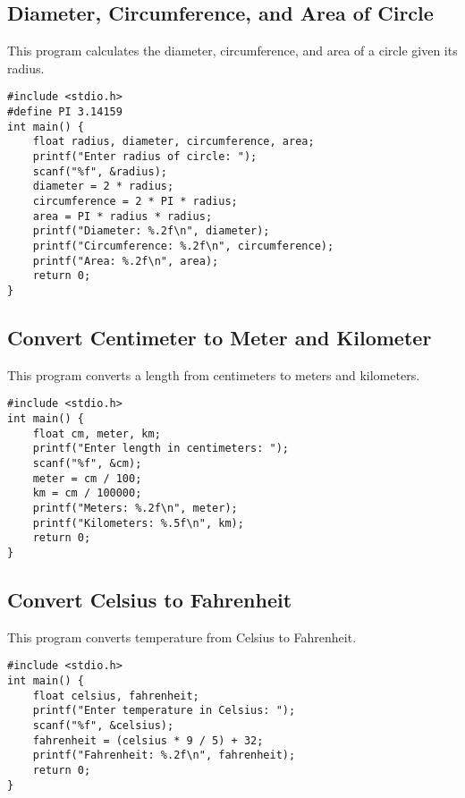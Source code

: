 \documentclass[a4paper,12pt]{article}
\begin{document}
\newpage

\subsection{Diameter, Circumference, and Area of Circle}
This program calculates the diameter, circumference, and area of a circle given its radius.

\begin{lstlisting}[caption={Diameter, Circumference, and Area of Circle}]
#include <stdio.h>
#define PI 3.14159
int main() {
    float radius, diameter, circumference, area;
    printf("Enter radius of circle: ");
    scanf("%f", &radius);
    diameter = 2 * radius;
    circumference = 2 * PI * radius;
    area = PI * radius * radius;
    printf("Diameter: %.2f\n", diameter);
    printf("Circumference: %.2f\n", circumference);
    printf("Area: %.2f\n", area);
    return 0;
}
\end{lstlisting}

\newpage

\subsection{Convert Centimeter to Meter and Kilometer}
This program converts a length from centimeters to meters and kilometers.

\begin{lstlisting}[caption={Convert Centimeter to Meter and Kilometer}]
#include <stdio.h>
int main() {
    float cm, meter, km;
    printf("Enter length in centimeters: ");
    scanf("%f", &cm);
    meter = cm / 100;
    km = cm / 100000;
    printf("Meters: %.2f\n", meter);
    printf("Kilometers: %.5f\n", km);
    return 0;
}
\end{lstlisting}

\newpage

\subsection{Convert Celsius to Fahrenheit}
This program converts temperature from Celsius to Fahrenheit.

\begin{lstlisting}[caption={Convert Celsius to Fahrenheit}]
#include <stdio.h>
int main() {
    float celsius, fahrenheit;
    printf("Enter temperature in Celsius: ");
    scanf("%f", &celsius);
    fahrenheit = (celsius * 9 / 5) + 32;
    printf("Fahrenheit: %.2f\n", fahrenheit);
    return 0;
}
\end{lstlisting}
\end{document}
